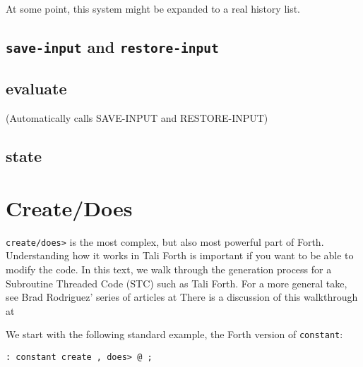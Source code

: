 
At some point, this system might be expanded to a real history list.


\subsection{\texttt{save-input} and \texttt{restore-input}}




\subsection{evaluate}

(Automatically calls SAVE-INPUT and RESTORE-INPUT)


\subsection{state}




\section{Create/Does}

\texttt{create/does>} is the most complex, but also most powerful part of Forth.
Understanding how it works in Tali Forth is important if you want to be able to
modify the code. In this text, we walk through the generation process for a
Subroutine Threaded Code (STC) such as Tali Forth. For a more general take, see
Brad Rodriguez' series of articles at
There is a discussion of this walkthrough at

We start with the following standard example, the Forth version of
\texttt{constant}: 

\begin{lstlisting}[frame=single]
        : constant create , does> @ ; 
\end{lstlisting}

